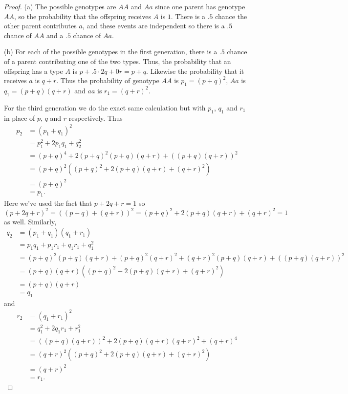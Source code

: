 \documentclass{article}
\begin{document}
\begin{proof}
(a) The possible genotypes are $AA$ and $Aa$ since one parent has genotype $AA$, so the probability that the offspring receives $A$ is $1$. There is a $.5$ chance the other parent contributes $a$, and these events are independent so there is a $.5$ chance of $AA$ and a $.5$ chance of $Aa$.

(b) For each of the possible genotypes in the first generation, there is a $.5$ chance of a parent contributing one of the two types. Thus, the probability that an offspring has a type $A$ is $p + .5 \cdot 2q + 0r = p + q$. Likewise the probability that it receives $a$ is $q + r$. Thus the probability of genotype $AA$ is $p_1 = (p+q)^2$, $Aa$ is $q_1 = (p+q)(q+r)$ and $aa$ is $r_1 = (q+r)^2$.

For the third generation we do the exact same calculation but with $p_1$, $q_1$ and $r_1$ in place of $p$, $q$ and $r$ respectively. Thus
\begin{align*}
p_2
&= (p_1 + q_1)^2\\
&= p_1^2 + 2p_1q_1 + q_2^2\\
&= (p+q)^4 + 2(p + q)^2(p+q)(q+r) + ((p+q)(q+r))^2\\
&= (p+q)^2((p+q)^2 + 2(p+q)(q+r) + (q+r)^2)\\
&= (p+q)^2\\
&= p_1.
\end{align*}
Here we've used the fact that $p + 2q + r = 1$ so
\[
(p + 2q + r)^2 = ((p+q) + (q+r))^2 = (p+q)^2 + 2(p+q)(q+r) + (q+r)^2 = 1
\]
as well. Similarly,
\begin{align*}
q_2
&= (p_1 + q_1)(q_1 + r_1)\\
&= p_1q_1 + p_1r_1 + q_1r_1 + q_1^2\\
&= (p + q)^2(p+q)(q+r) + (p+q)^2(q+r)^2 + (q+r)^2(p+q)(q+r) + ((p+q)(q+r))^2\\
&= (p+q)(q+r)((p+q)^2 + 2(p+q)(q+r) + (q+r)^2)\\
&= (p+q)(q+r)\\
&= q_1
\end{align*}
and
\begin{align*}
r_2
&= (q_1 + r_1)^2\\
&= q_1^2 + 2q_1r_1 + r_1^2\\
&= ((p+q)(q+r))^2 + 2(p+q)(q+r)(q+r)^2 + (q+r)^4\\
&= (q+r)^2((p+q)^2 + 2(p+q)(q+r) + (q+r)^2)\\
&= (q+r)^2\\
&= r_1.
\end{align*}


\end{proof}
\end{document}
